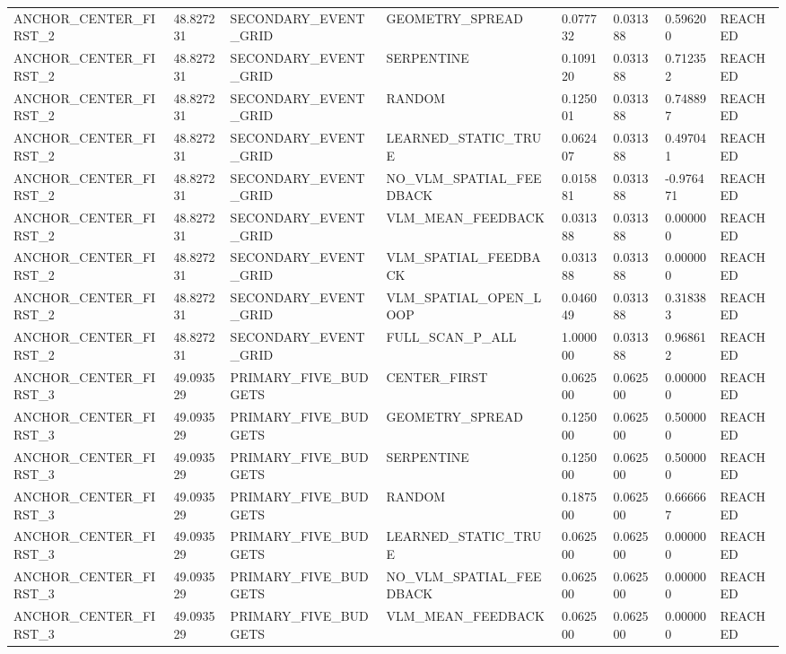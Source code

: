 \begin{tabular}{llllllll}
ANCHOR\_CENTER\_FIRST\_2 & 48.827231 & SECONDARY\_EVENT\_GRID & GEOMETRY\_SPREAD & 0.077732 & 0.031388 & 0.596200 & REACHED \\
ANCHOR\_CENTER\_FIRST\_2 & 48.827231 & SECONDARY\_EVENT\_GRID & SERPENTINE & 0.109120 & 0.031388 & 0.712352 & REACHED \\
ANCHOR\_CENTER\_FIRST\_2 & 48.827231 & SECONDARY\_EVENT\_GRID & RANDOM & 0.125001 & 0.031388 & 0.748897 & REACHED \\
ANCHOR\_CENTER\_FIRST\_2 & 48.827231 & SECONDARY\_EVENT\_GRID & LEARNED\_STATIC\_TRUE & 0.062407 & 0.031388 & 0.497041 & REACHED \\
ANCHOR\_CENTER\_FIRST\_2 & 48.827231 & SECONDARY\_EVENT\_GRID & NO\_VLM\_SPATIAL\_FEEDBACK & 0.015881 & 0.031388 & -0.976471 & REACHED \\
ANCHOR\_CENTER\_FIRST\_2 & 48.827231 & SECONDARY\_EVENT\_GRID & VLM\_MEAN\_FEEDBACK & 0.031388 & 0.031388 & 0.000000 & REACHED \\
ANCHOR\_CENTER\_FIRST\_2 & 48.827231 & SECONDARY\_EVENT\_GRID & VLM\_SPATIAL\_FEEDBACK & 0.031388 & 0.031388 & 0.000000 & REACHED \\
ANCHOR\_CENTER\_FIRST\_2 & 48.827231 & SECONDARY\_EVENT\_GRID & VLM\_SPATIAL\_OPEN\_LOOP & 0.046049 & 0.031388 & 0.318383 & REACHED \\
ANCHOR\_CENTER\_FIRST\_2 & 48.827231 & SECONDARY\_EVENT\_GRID & FULL\_SCAN\_P\_ALL & 1.000000 & 0.031388 & 0.968612 & REACHED \\
ANCHOR\_CENTER\_FIRST\_3 & 49.093529 & PRIMARY\_FIVE\_BUDGETS & CENTER\_FIRST & 0.062500 & 0.062500 & 0.000000 & REACHED \\
ANCHOR\_CENTER\_FIRST\_3 & 49.093529 & PRIMARY\_FIVE\_BUDGETS & GEOMETRY\_SPREAD & 0.125000 & 0.062500 & 0.500000 & REACHED \\
ANCHOR\_CENTER\_FIRST\_3 & 49.093529 & PRIMARY\_FIVE\_BUDGETS & SERPENTINE & 0.125000 & 0.062500 & 0.500000 & REACHED \\
ANCHOR\_CENTER\_FIRST\_3 & 49.093529 & PRIMARY\_FIVE\_BUDGETS & RANDOM & 0.187500 & 0.062500 & 0.666667 & REACHED \\
ANCHOR\_CENTER\_FIRST\_3 & 49.093529 & PRIMARY\_FIVE\_BUDGETS & LEARNED\_STATIC\_TRUE & 0.062500 & 0.062500 & 0.000000 & REACHED \\
ANCHOR\_CENTER\_FIRST\_3 & 49.093529 & PRIMARY\_FIVE\_BUDGETS & NO\_VLM\_SPATIAL\_FEEDBACK & 0.062500 & 0.062500 & 0.000000 & REACHED \\
ANCHOR\_CENTER\_FIRST\_3 & 49.093529 & PRIMARY\_FIVE\_BUDGETS & VLM\_MEAN\_FEEDBACK & 0.062500 & 0.062500 & 0.000000 & REACHED \\

\end{tabular}
